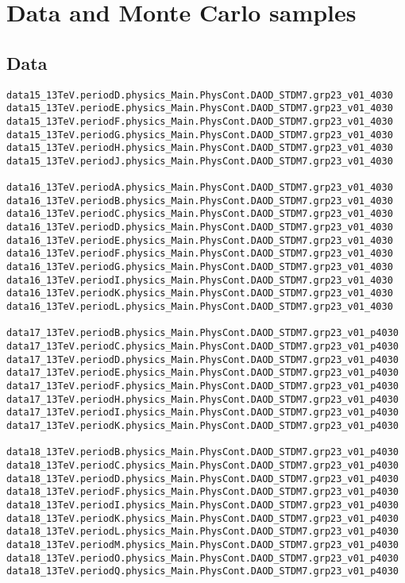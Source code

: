 \section{Data and Monte Carlo samples}
\label{app:datasets}

\subsection{Data}
\begin{tiny}
\begin{verbatim}
data15_13TeV.periodD.physics_Main.PhysCont.DAOD_STDM7.grp23_v01_4030
data15_13TeV.periodE.physics_Main.PhysCont.DAOD_STDM7.grp23_v01_4030
data15_13TeV.periodF.physics_Main.PhysCont.DAOD_STDM7.grp23_v01_4030
data15_13TeV.periodG.physics_Main.PhysCont.DAOD_STDM7.grp23_v01_4030
data15_13TeV.periodH.physics_Main.PhysCont.DAOD_STDM7.grp23_v01_4030
data15_13TeV.periodJ.physics_Main.PhysCont.DAOD_STDM7.grp23_v01_4030

data16_13TeV.periodA.physics_Main.PhysCont.DAOD_STDM7.grp23_v01_4030
data16_13TeV.periodB.physics_Main.PhysCont.DAOD_STDM7.grp23_v01_4030
data16_13TeV.periodC.physics_Main.PhysCont.DAOD_STDM7.grp23_v01_4030
data16_13TeV.periodD.physics_Main.PhysCont.DAOD_STDM7.grp23_v01_4030
data16_13TeV.periodE.physics_Main.PhysCont.DAOD_STDM7.grp23_v01_4030
data16_13TeV.periodF.physics_Main.PhysCont.DAOD_STDM7.grp23_v01_4030
data16_13TeV.periodG.physics_Main.PhysCont.DAOD_STDM7.grp23_v01_4030
data16_13TeV.periodI.physics_Main.PhysCont.DAOD_STDM7.grp23_v01_4030
data16_13TeV.periodK.physics_Main.PhysCont.DAOD_STDM7.grp23_v01_4030
data16_13TeV.periodL.physics_Main.PhysCont.DAOD_STDM7.grp23_v01_4030

data17_13TeV.periodB.physics_Main.PhysCont.DAOD_STDM7.grp23_v01_p4030
data17_13TeV.periodC.physics_Main.PhysCont.DAOD_STDM7.grp23_v01_p4030
data17_13TeV.periodD.physics_Main.PhysCont.DAOD_STDM7.grp23_v01_p4030
data17_13TeV.periodE.physics_Main.PhysCont.DAOD_STDM7.grp23_v01_p4030
data17_13TeV.periodF.physics_Main.PhysCont.DAOD_STDM7.grp23_v01_p4030
data17_13TeV.periodH.physics_Main.PhysCont.DAOD_STDM7.grp23_v01_p4030
data17_13TeV.periodI.physics_Main.PhysCont.DAOD_STDM7.grp23_v01_p4030
data17_13TeV.periodK.physics_Main.PhysCont.DAOD_STDM7.grp23_v01_p4030

data18_13TeV.periodB.physics_Main.PhysCont.DAOD_STDM7.grp23_v01_p4030
data18_13TeV.periodC.physics_Main.PhysCont.DAOD_STDM7.grp23_v01_p4030
data18_13TeV.periodD.physics_Main.PhysCont.DAOD_STDM7.grp23_v01_p4030
data18_13TeV.periodF.physics_Main.PhysCont.DAOD_STDM7.grp23_v01_p4030
data18_13TeV.periodI.physics_Main.PhysCont.DAOD_STDM7.grp23_v01_p4030
data18_13TeV.periodK.physics_Main.PhysCont.DAOD_STDM7.grp23_v01_p4030
data18_13TeV.periodL.physics_Main.PhysCont.DAOD_STDM7.grp23_v01_p4030
data18_13TeV.periodM.physics_Main.PhysCont.DAOD_STDM7.grp23_v01_p4030
data18_13TeV.periodO.physics_Main.PhysCont.DAOD_STDM7.grp23_v01_p4030
data18_13TeV.periodQ.physics_Main.PhysCont.DAOD_STDM7.grp23_v01_p4030

\end{verbatim}
\end{tiny}

